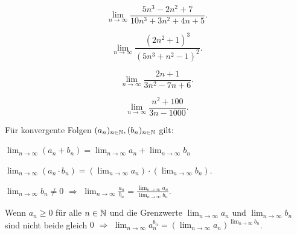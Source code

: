 


\begin{bsp} 
	{\ } 
	\begin{enuma} 
		\item \[
			\lim_{n \to \infty} \frac{5 n^3 - 2n^2 + 7}{10 n^3 + 3 n^2+ 4 n+5}.
		\]
		\item 
		\[
			\lim_{n \to \infty} \frac{(2 n^2 + 1 )^3 }{(5 n^3 + n^2 - 1)^2}.
		\]
		\item 
			\[
				\lim_{n \to \infty} \frac{2 n + 1}{3  n^2 - 7 n + 6}.
		\]
		\item 
		\[
			\lim_{n \to \infty} \frac{n^2 + 100}{3 n-1000} .
		\]
	\end{enuma} 
\end{bsp} 

\begin{thm} 
	Für konvergente Folgen $(a_n)_{n \in \mathbb{N}}, (b_n)_{n \in \mathbb{N}}$ gilt: 
	\begin{enuma}
		\item $\lim_{n \to \infty} (a_n + b_n) = \lim_{n \to \infty} a_n + \lim_{n \to \infty} b_n $
		\item $\lim_{n \to \infty} (a_n \cdot b_n) = ( \lim_{n \to \infty} a_n) \cdot (\lim_{n \to \infty} b_n)$. 
		\item $\lim_{n \to \infty} b_n \ne 0$ $\Longrightarrow$ $\lim_{n \to \infty} \frac{a_n}{b_n} = \frac{\lim_{n \to \infty} a_n}{\lim_{n \to \infty} b_n}$. 
		\item Wenn $a_n \ge 0$ für alle $n \in \mathbb{N}$ und die Grenzwerte $\lim_{n \to \infty} a_n$ und $\lim_{n \to \infty} b_n$ sind nicht beide gleich $0$ $\Longrightarrow$ $\lim_{n \to \infty} a_n^{b_n} = (\lim_{n \to \infty} a_n )^{\lim_{n \to \infty} b_n}$. 
	\end{enuma} 
\end{thm} 

